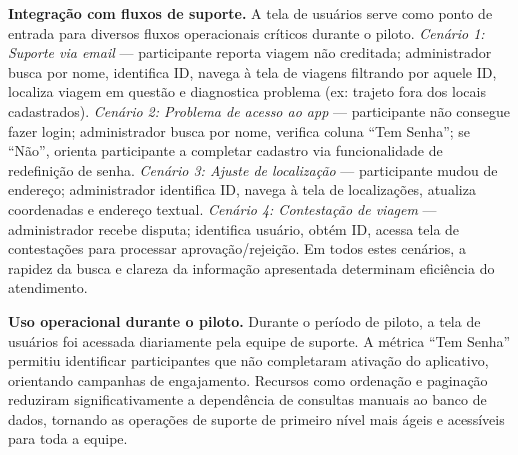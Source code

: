 \textbf{Integração com fluxos de suporte.} A tela de usuários serve como ponto de
entrada para diversos fluxos operacionais críticos durante o piloto. \textit{Cenário
1: Suporte via email} --- participante reporta viagem não creditada; administrador
busca por nome, identifica ID, navega à tela de viagens filtrando por aquele ID,
localiza viagem em questão e diagnostica problema (ex: trajeto fora dos locais
cadastrados). \textit{Cenário 2: Problema de acesso ao app} --- participante não
consegue fazer login; administrador busca por nome, verifica coluna ``Tem Senha''; se
``Não'', orienta participante a completar cadastro via funcionalidade de redefinição
de senha. \textit{Cenário 3: Ajuste de localização} --- participante mudou de
endereço; administrador identifica ID, navega à tela de localizações, atualiza
coordenadas e endereço textual. \textit{Cenário 4: Contestação de viagem} ---
administrador recebe disputa; identifica usuário, obtém ID, acessa tela de
contestações para processar aprovação/rejeição. Em todos estes cenários, a rapidez
da busca e clareza da informação apresentada determinam eficiência do atendimento.

\textbf{Uso operacional durante o piloto.} Durante o período de piloto, a
tela de usuários foi acessada diariamente pela equipe de suporte.
A métrica ``Tem Senha'' permitiu identificar participantes que não completaram ativação do aplicativo, 
orientando campanhas de engajamento. Recursos como ordenação e paginação reduziram significativamente a 
dependência de consultas manuais ao banco de dados, tornando as operações de suporte de primeiro nível mais ágeis
e acessíveis para toda a equipe.
